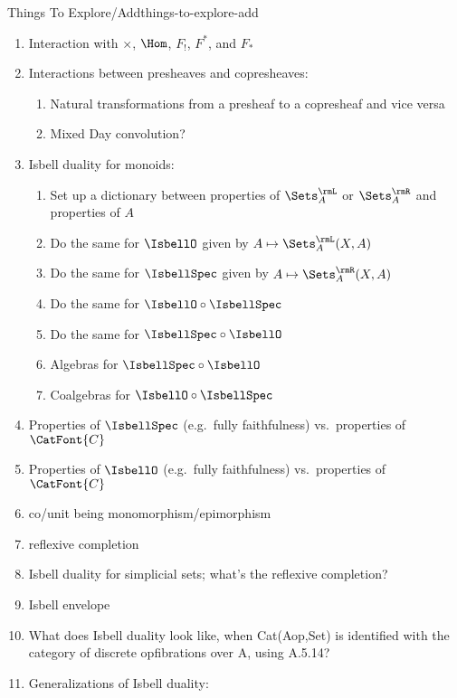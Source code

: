 \begin{remark}{Things To Explore/Add}{things-to-explore-add}
\begin{enumerate}
        \item Interaction with $\times$, $\Hom$, $F_{!}$, $F^{*}$, and $F_{*}$
        \item Interactions between presheaves and copresheaves:
            \begin{enumerate}
                \item Natural transformations from a presheaf to a copresheaf and vice versa
                \item Mixed Day convolution?
            \end{enumerate}
        \item Isbell duality for monoids:
            \begin{enumerate}
                \item Set up a dictionary between properties of $\Sets^{\rmL}_{A}$ or $\Sets^{\rmR}_{A}$ and properties of $A$
                \item Do the same for $\IsbellO$ given by $A\mapsto\Sets^{\rmL}_{A}(X,A)$
                \item Do the same for $\IsbellSpec$ given by $A\mapsto\Sets^{\rmR}_{A}(X,A)$
                \item Do the same for $\IsbellO\circ\IsbellSpec$
                \item Do the same for $\IsbellSpec\circ\IsbellO$
                \item Algebras for $\IsbellSpec\circ\IsbellO$
                \item Coalgebras for $\IsbellO\circ\IsbellSpec$
            \end{enumerate}
        \item Properties of $\IsbellSpec$ (e.g.\ fully faithfulness) vs.\ properties of $\CatFont{C}$
        \item Properties of $\IsbellO$ (e.g.\ fully faithfulness) vs.\ properties of $\CatFont{C}$
        \item co/unit being monomorphism/epimorphism
        \item reflexive completion
        \item Isbell duality for simplicial sets; what's the reflexive completion?
        \item Isbell envelope
        \item What does Isbell duality look like, when Cat(Aop,Set) is identified with the category of discrete opfibrations over A, using A.5.14?
        \item Generalizations of Isbell duality:
            \begin{enumerate}

\end{enumerate}
\end{enumerate}
\end{remark}
